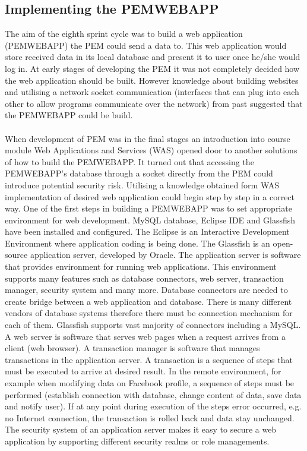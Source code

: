 \documentclass[12pt, a4paper]{report}   %
\begin{document}
\begin{enumerate}
\section{Implementing the PEMWEBAPP}
The aim of the eighth sprint cycle was to build a web application (PEMWEBAPP) the PEM could send a data to. This web application would store received data in its local database and present it to user once he/she would log in. At early stages of developing the PEM it was not completely decided how the web application should be built. However knowledge about building websites and utilising a network socket communication (interfaces that can plug into each other to allow programs communicate over the network) from past suggested that the PEMWEBAPP could be build.\\ \\
When development of PEM was in the final stages an introduction into course module Web Applications and Services (WAS) opened door to another solutions of how to build the PEMWEBAPP. It turned out that accessing the PEMWEBAPP's database through a socket directly from the PEM could introduce potential security risk. Utilising a knowledge obtained form WAS implementation of desired web application could begin step by step in a correct way.
One of the first steps in building a PEMWEBAPP was to set appropriate environment for web development. MySQL database, Eclipse IDE and Glassfish have been installed and configured. The Eclipse is an Interactive Development Environment where application coding is being done. The Glassfish is an open-source application server, developed by Oracle. The application server is software that provides environment for running web applications. This environment supports many features such as database connectors, web server, transaction manager, security system and many more. Database connectors are needed to create bridge between a web application and database. There is many different vendors of database systems therefore there must be connection mechanism for each of them.  Glassfish supports vast majority of connectors including a MySQL. A web server is software that serves web pages when a request arrives from a client (web browser).  A transaction manager is software that manages transactions in the application server. A transaction is a sequence of steps that must be executed to arrive at desired result. In the remote environment, for example when modifying data on Facebook profile, a sequence of steps must be performed (establish connection with database, change content of data, save data and notify user).  If at any point during execution of the steps error occurred, e.g. no Internet connection, the transaction is rolled back and data stay unchanged. The security system of an application server makes it easy to secure a web application by supporting different security realms or role managements.\\ \\

\end{enumerate}
\end{document}

